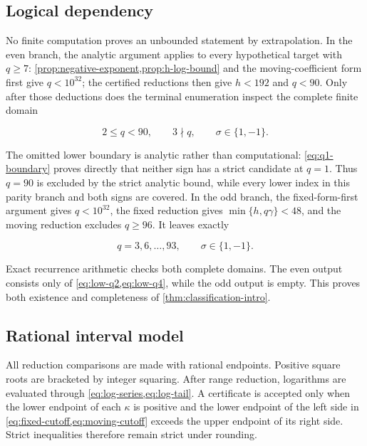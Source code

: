 \subsection{Logical dependency}

No finite computation proves an unbounded statement by extrapolation. In the
even branch, the analytic argument applies to every hypothetical target with
$q\geqslant7$: \cref{prop:negative-exponent,prop:h-log-bound} and the
moving-coefficient form first give $q<10^{32}$; the certified reductions then
give $h<192$ and $q<90$. Only after those deductions does the terminal
enumeration inspect the complete finite domain

\begin{equation}
 2\leqslant q<90,
 \qquad
 3\nmid q,
 \qquad
 \sigma\in\{1,-1\}.
 \label{eq:terminal-domain}
\end{equation}

The omitted lower boundary is analytic rather than computational:
\cref{eq:q1-boundary} proves directly that neither sign has a strict
candidate at $q=1$. Thus $q=90$ is excluded by the strict analytic bound,
while every lower index in this parity branch and both signs are covered.
In the odd branch,
the fixed-form-first argument gives $q<10^{32}$, the fixed reduction gives
$\min\{h,q\gamma\}<48$, and the moving reduction excludes $q\geqslant96$.
It leaves exactly

\begin{equation}
 q=3,6,\ldots,93,
 \qquad
 \sigma\in\{1,-1\}.
 \label{eq:odd-terminal-domain-appendix}
\end{equation}

Exact recurrence arithmetic checks both complete domains. The even output
consists only of \cref{eq:low-q2,eq:low-q4}, while the odd output is empty.
This proves both existence and completeness of
\cref{thm:classification-intro}.

\subsection{Rational interval model}

All reduction comparisons are made with rational endpoints. Positive square
roots are bracketed by integer squaring. After range reduction, logarithms
are evaluated through \cref{eq:log-series,eq:log-tail}. A certificate is
accepted only when the lower endpoint of each $\kappa$ is positive and the
lower endpoint of the left side in
\cref{eq:fixed-cutoff,eq:moving-cutoff} exceeds the upper endpoint of its
right side. Strict inequalities therefore remain strict under rounding.

